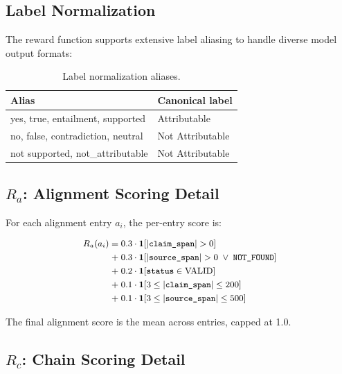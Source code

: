 \documentclass[11pt]{article}
\begin{document}
\subsection{Label Normalization}

The reward function supports extensive label aliasing to handle diverse model output formats:

\begin{table}[h]
\centering
\small
\caption{Label normalization aliases.}
\label{tab:aliases}
\begin{tabular}{ll}
\toprule
\textbf{Alias} & \textbf{Canonical label} \\
\midrule
yes, true, entailment, supported & Attributable \\
no, false, contradiction, neutral & Not Attributable \\
not supported, not\_attributable & Not Attributable \\
\bottomrule
\end{tabular}
\vspace{-6pt}
\end{table}

\subsection{$R_a$: Alignment Scoring Detail}

For each alignment entry $a_i$, the per-entry score is:

\begin{equation}
\small
\begin{aligned}
R_a(a_i) = & \; 0.3 \cdot \mathbf{1}[|\texttt{claim\_span}| > 0] \\
          + & \; 0.3 \cdot \mathbf{1}[|\texttt{source\_span}| > 0 \;\lor\; \texttt{NOT\_FOUND}] \\
          + & \; 0.2 \cdot \mathbf{1}[\texttt{status} \in \text{VALID}] \\
          + & \; 0.1 \cdot \mathbf{1}[3 \leq |\texttt{claim\_span}| \leq 200] \\
          + & \; 0.1 \cdot \mathbf{1}[3 \leq |\texttt{source\_span}| \leq 500]
\end{aligned}
\end{equation}

The final alignment score is the mean across entries, capped at 1.0.

\subsection{$R_c$: Chain Scoring Detail}
\end{document}
